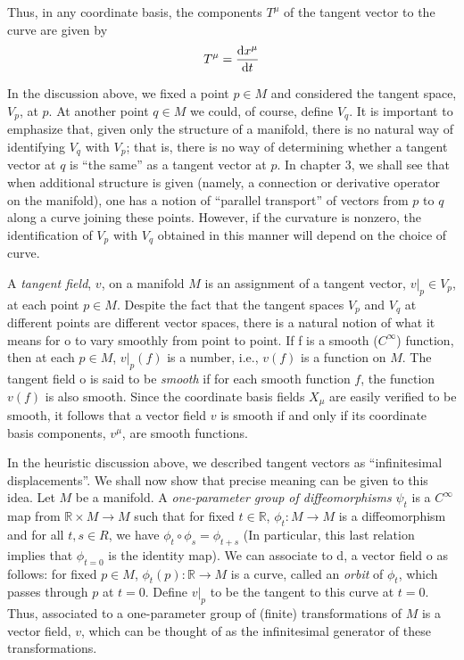 Thus, in any coordinate basis, the components $T^\mu$ of the tangent vector to the curve are given by
\begin{equation}
    T^\mu=\odv{x^\mu}t
    \label{2.2.12}
\end{equation}

In the discussion above, we fixed a point $p\in M$ and considered the tangent space, $V_p$, at $p$. At another point $q\in M$ we could, of course, define $V_q$. It is important to emphasize that, given only the structure of a manifold, there is no natural way of identifying $V_q$ with $V_p$; that is, there is no way of determining whether a tangent vector at $q$ is ``the same'' as a tangent vector at $p$. In chapter 3, we shall see that when additional structure is given (namely, a connection or derivative operator on the manifold), one has a notion of ``parallel transport'' of vectors from $p$ to $q$ along a curve joining these points. However, if the curvature is nonzero, the identification of $V_p$ with $V_q$ obtained in this manner will depend on the choice of curve.

A \emph{tangent field}, $v$, on a manifold $M$ is an assignment of a tangent vector, $v|_p\in V_p$, at each point $p\in M$. Despite the fact that the tangent spaces $V_p$ and $V_q$ at different points are different vector spaces, there is a natural notion of what it means for o to vary smoothly from point to point. If f is a smooth ($C^\infty$) function, then at each $p\in M$, $v|_p(f)$ is a number, i.e., $v(f)$ is a function on $M$. The tangent field o is said to be \emph{smooth} if for each smooth function $f$, the function $v(f)$ is also smooth. Since the coordinate basis fields $X_\mu$ are easily verified to be smooth, it follows that a vector field $v$ is smooth if and only if its coordinate basis components, $v^\mu$, are smooth functions.

In the heuristic discussion above, we described tangent vectors as ``infinitesimal displacements''. We shall now show that precise meaning can be given to this idea. Let $M$ be a manifold. A \emph{one-parameter group of diffeomorphisms} $\psi_t$ is a $C^\infty$ map from $\mathbb{R}\times M\to M$ such that for fixed $t\in\mathbb{R}$, $\phi_t:M\to M$ is a diffeomorphism and for all $t,s\in R$, we have $\phi_t\circ\phi_s=\phi_{t+s}$ (In particular, this last relation implies that $\phi_{t=0}$ is the identity map). We can associate to d, a vector field o as follows: for fixed $p\in M$, $\phi_t(p):\mathbb{R}\to M$ is a curve, called an \emph{orbit} of $\phi_t$, which passes through $p$ at $t=0$. Define $v|_p$ to be the tangent to this curve at $t=0$. Thus, associated to a one-parameter group of (finite) transformations of $M$ is a vector field, $v$, which can be thought of as the infinitesimal generator of these transformations.

